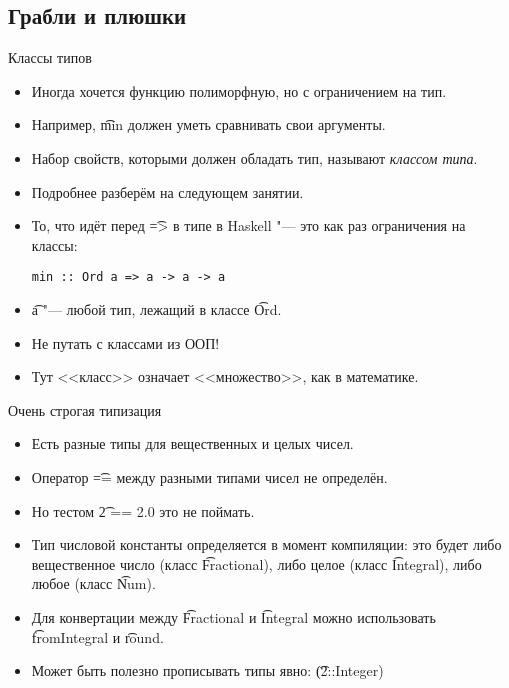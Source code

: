 \subsection{Грабли и плюшки}

\begin{frame}
\end{frame}

\begin{frame}[fragile]{Классы типов}
	\begin{itemize}
		\item Иногда хочется функцию полиморфную, но с ограничением на тип.
		\item Например, \t{min} должен уметь сравнивать свои аргументы.
		\item Набор свойств, которыми должен обладать тип, называют \textit{классом типа}.
		\item Подробнее разберём на следующем занятии.
		\item То, что идёт перед \t{=>} в типе в Haskell "--- это как раз ограничения на классы:
\begin{verbatim}
min :: Ord a => a -> a -> a
\end{verbatim}
		\item \t{a} "--- любой тип, лежащий в классе \t{Ord}.
		\item Не путать с классами из ООП!
		\item Тут <<класс>> означает <<множество>>, как в математике.
	\end{itemize}
\end{frame}

\begin{frame}{Очень строгая типизация}
	\begin{itemize}
		\item Есть разные типы для вещественных и целых чисел.
		\item Оператор \t{==} между разными типами чисел не определён.
		\item Но тестом \t{2 == 2.0} это не поймать.
		\item Тип числовой константы определяется в момент компиляции: это будет либо вещественное число (класс \t{Fractional}), либо целое (класс \t{Integral}), либо любое (класс \t{Num}).
		\item Для конвертации между \t{Fractional} и \t{Integral} можно использовать \t{fromIntegral} и \t{round}.
		\item Может быть полезно прописывать типы явно: \t{(2::Integer)}
	\end{itemize}
\end{frame}

